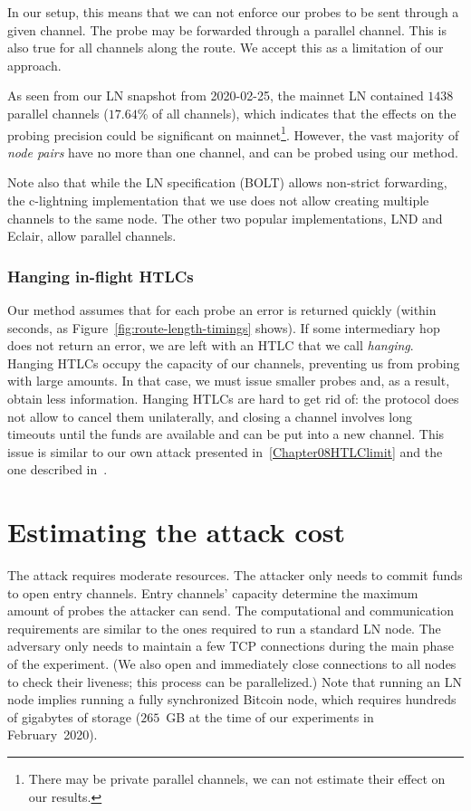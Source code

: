 In our setup, this means that we can not enforce our probes to be sent through a given channel.
The probe may be forwarded through a parallel channel.
This is also true for all channels along the route.
We accept this as a limitation of our approach.

As seen from our LN snapshot from 2020-02-25, the mainnet LN contained $1438$ parallel channels ($17.64$\% of all channels), which indicates that the effects on the probing precision could be significant on mainnet\footnote{There may be private parallel channels, we can not estimate their effect on our results.}.
However, the vast majority of \textit{node pairs} have no more than one channel, and can be probed using our method.

Note also that while the LN specification (BOLT) allows non-strict forwarding, the c-lightning implementation that we use does not allow creating multiple channels to the same node.
The other two popular implementations, LND and Eclair, allow parallel channels.

\subsubsection*{Hanging in-flight HTLCs}

Our method assumes that for each probe an error is returned quickly (within seconds, as Figure~\ref{fig:route-length-timings} shows).
If some intermediary hop does not return an error, we are left with an HTLC that we call \textit{hanging}.
Hanging HTLCs occupy the capacity of our channels, preventing us from probing with large amounts.
In that case, we must issue smaller probes and, as a result, obtain less information.
Hanging HTLCs are hard to get rid of: the protocol does not allow to cancel them unilaterally, and closing a channel involves long timeouts until the funds are available and can be put into a new channel.
This issue is similar to our own attack presented in~\ref{Chapter08HTLClimit} and the one described in~\cite{Mizrahi2020}.



\section{Estimating the attack cost}

The attack requires moderate resources.
The attacker only needs to commit funds to open entry channels.
Entry channels' capacity determine the maximum amount of probes the attacker can send.
The computational and communication requirements are similar to the ones required to run a standard LN node.
The adversary only needs to maintain a few TCP connections during the main phase of the experiment.
(We also open and immediately close connections to all nodes to check their liveness; this process can be parallelized.)
Note that running an LN node implies running a fully synchronized Bitcoin node, which requires hundreds of gigabytes of storage ($265$~GB at the time of our experiments in February~2020).

